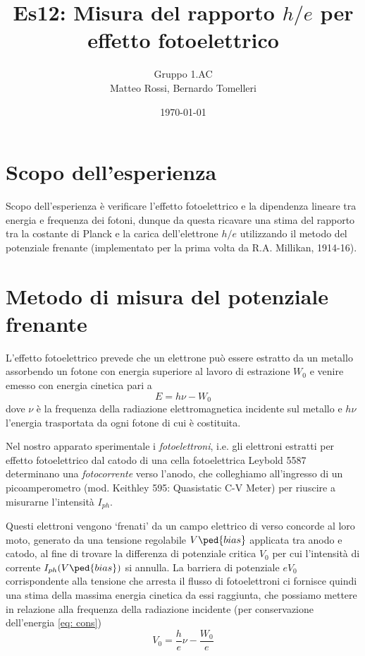 \documentclass[10pt, a4paper, italian]{article}
\author{Gruppo 1.AC \\ Matteo Rossi, Bernardo Tomelleri}
\title{Es12: Misura del rapporto $h/e$ per effetto fotoelettrico}
\begin{document}
\date{\today}
\maketitle

\section{Scopo dell'esperienza}
Scopo dell'esperienza è verificare l'effetto fotoelettrico e la dipendenza
lineare tra energia e frequenza dei fotoni, dunque da questa ricavare una stima
del rapporto tra la costante di Planck e la carica dell'elettrone $h/e$
utilizzando il metodo del potenziale frenante (implementato per la prima volta
da R.A. Millikan, 1914-16).

\section{Metodo di misura del potenziale frenante}
L'effetto fotoelettrico prevede che un elettrone può essere estratto da un
metallo assorbendo un fotone con energia superiore al lavoro di estrazione
$W_{0}$ e venire emesso con energia cinetica pari a
\begin{equation}\label{eq: cons}
E = h \nu - W_0
\end{equation}
dove $\nu$ è la frequenza della radiazione elettromagnetica incidente sul
metallo e $h \nu$ l'energia trasportata da ogni fotone di cui è costituita.

Nel nostro apparato sperimentale i \emph{fotoelettroni}, i.e. gli elettroni
estratti per effetto fotoelettrico dal catodo di una cella fotoelettrica
Leybold 5587 determinano una \emph{fotocorrente} verso l'anodo, che
colleghiamo all'ingresso di un picoamperometro (mod. Keithley 595: Quasistatic
C-V Meter) per riuscire a misurarne l'intensità $I_{ph}$.

Questi elettroni vengono `frenati' da un campo elettrico di verso concorde al
loro moto, generato da una tensione regolabile $V\ped{bias}$ applicata tra
anodo e catodo, al fine di trovare la differenza di potenziale critica $V_0$
per cui l'intensità di corrente $I_{ph}(V\ped{bias})$ si annulla.
La barriera di potenziale $eV_0$ corrispondente alla tensione che arresta il
flusso di fotoelettroni ci fornisce quindi una stima della massima
energia cinetica da essi raggiunta, che possiamo mettere in relazione alla
frequenza della radiazione incidente (per conservazione dell'energia
\cref{eq: cons})
\begin{equation}\label{eq: V0}
V_0 = \frac{h}{e} \nu - \frac{W_0}{e}
\end{equation}
\end{document}
